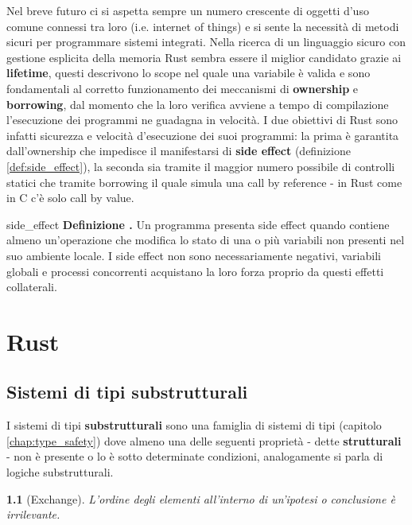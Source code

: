\documentclass[Lau,binding=0.6cm]{sapthesis}
\newtheorem{lemma}[theorem]{}
\newenvironment{myDefinition}[2]{ \begin{Definizione}[adjusted title=#1]{}{#2}
    \textbf{Definizione \thetcbcounter.} }{\end{Definizione}}
\begin{document}
Nel breve futuro ci si aspetta sempre un numero crescente di oggetti d'uso comune connessi tra loro (i.e. internet of things) e si sente la necessità di metodi sicuri per programmare sistemi integrati. 
Nella ricerca di un linguaggio sicuro con gestione esplicita della memoria Rust sembra essere il miglior candidato grazie ai \textbf{lifetime}, questi descrivono lo scope nel quale una variabile è valida e sono fondamentali al corretto funzionamento dei meccanismi di \textbf{ownership} e \textbf{borrowing}, dal momento che la loro verifica avviene a tempo di compilazione l'esecuzione dei programmi ne guadagna in velocità. 
I due obiettivi di Rust sono infatti sicurezza e velocità d'esecuzione dei suoi programmi: la prima è garantita dall'ownership che impedisce il manifestarsi di \textbf{side effect} (definizione \ref{def:side_effect}), la seconda sia tramite il maggior numero possibile di controlli statici che tramite borrowing il quale simula una call by reference - in Rust come in C c'è solo call by value. 

\begin{myDefinition}{Side effect}{side_effect}
    Un programma presenta side effect quando contiene almeno un'operazione che modifica lo stato di una o più variabili non presenti nel suo ambiente locale.
    I side effect non sono necessariamente negativi, variabili globali e processi concorrenti acquistano la loro forza proprio da questi effetti collaterali.
\end{myDefinition}

\chapter{Rust}

\section{Sistemi di tipi substrutturali}

I sistemi di tipi \textbf{substrutturali} sono una famiglia di sistemi di tipi (capitolo \ref{chap:type_safety}) dove almeno una delle seguenti proprietà - dette \textbf{strutturali} - non è presente o lo è sotto determinate condizioni, analogamente si parla di logiche substrutturali.

\begin{lemma}[Exchange] \label{lemma:exchange}
    L'ordine degli elementi all'interno di un'ipotesi o conclusione è irrilevante.
\end{lemma}
\end{document}
